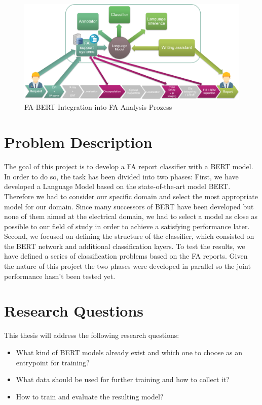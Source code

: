\begin{figure}[H]
	\centering	\includegraphics[width=1\textwidth]{figures/fa_bert_process.png}
	\caption{FA-BERT Integration into FA Analysis Prozess}
	\label{fig:fa_bert_process}
\end{figure}



\section{Problem Description}
The goal of this project is to develop a FA report classifier with a BERT model.
In order to do so, the task has been divided into two phases: \newline
First, we have developed a Language Model based on the state-of-the-art model BERT. Therefore we had to consider our specific domain and select the most appropriate model for our domain. Since many successors of BERT have been developed but none of them aimed at the electrical domain, we had to select a model as close as possible to our field of study in order to achieve a satisfying performance later. \newline
Second, we focused on defining the structure of the classifier, which consisted on the BERT network and additional classification layers. To test the results, we have defined a series of classification problems based on the FA reports. \newline
Given the nature of this project the two phases were developed in parallel so the joint performance hasn't been tested yet. \newline

\section{Research Questions}
This thesis will address the following research questions:
\begin{itemize}
	\item What kind of BERT models already exist and which one to choose as an entrypoint for training?
	\item What data should be used for further training and how to collect it?
	\item How to train and evaluate the resulting model?
\end{itemize}

